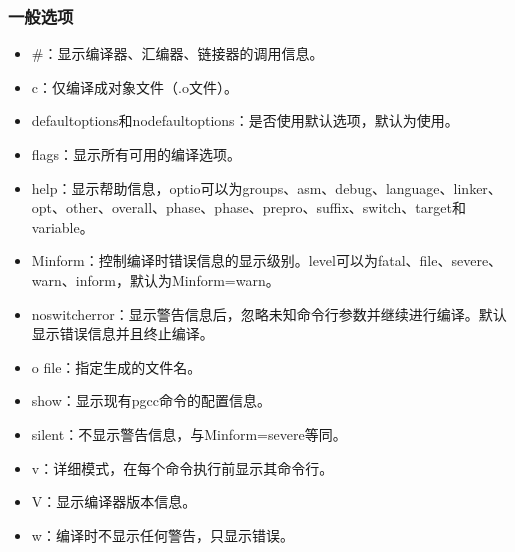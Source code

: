 \documentclass[a4paper,12pt,english]{sphinxmanual}
\begin{document}
\subsubsection{一般选项}
\label{\detokenize{compiler/pgi:id4}}\begin{itemize}
\item {} 
\sphinxAtStartPar
\sphinxhyphen{}\#：显示编译器、汇编器、链接器的调用信息。

\item {} 
\sphinxAtStartPar
\sphinxhyphen{}c：仅编译成对象文件（.o文件）。

\item {} 
\sphinxAtStartPar
\sphinxhyphen{}defaultoptions和\sphinxhyphen{}nodefaultoptions：是否使用默认选项，默认为使用。

\item {} 
\sphinxAtStartPar
\sphinxhyphen{}flags：显示所有可用的编译选项。

\item {} 
\sphinxAtStartPar
\sphinxhyphen{}help\sphinxstyleemphasis{{[}=option{]}}：显示帮助信息，optio可以为groups、asm、debug、language、linker、opt、other、overall、phase、phase、prepro、suffix、switch、target和variable。

\item {} 
\sphinxAtStartPar
\sphinxhyphen{}Minform：控制编译时错误信息的显示级别。level可以为fatal、file、severe、warn、inform，默认为\sphinxhyphen{}Minform=warn。

\item {} 
\sphinxAtStartPar
\sphinxhyphen{}noswitcherror：显示警告信息后，忽略未知命令行参数并继续进行编译。默认显示错误信息并且终止编译。

\item {} 
\sphinxAtStartPar
\sphinxhyphen{}o file：指定生成的文件名。

\item {} 
\sphinxAtStartPar
\sphinxhyphen{}show：显示现有pgcc命令的配置信息。

\item {} 
\sphinxAtStartPar
\sphinxhyphen{}silent：不显示警告信息，与\sphinxhyphen{}Minform=severe等同。

\item {} 
\sphinxAtStartPar
\sphinxhyphen{}v：详细模式，在每个命令执行前显示其命令行。

\item {} 
\sphinxAtStartPar
\sphinxhyphen{}V：显示编译器版本信息。

\item {} 
\sphinxAtStartPar
\sphinxhyphen{}w：编译时不显示任何警告，只显示错误。

\end{itemize}
\end{document}
